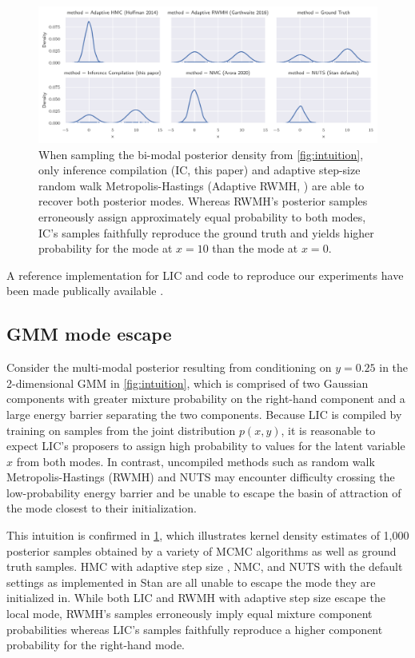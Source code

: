\documentclass[twoside]{article}
\begin{document}
\begin{figure}
  \includegraphics[width=\linewidth]{Figures/mode_escape.pdf}
  \caption{
    When sampling the bi-modal posterior density from \cref{fig:intuition},
    only inference compilation (IC, this paper) and adaptive step-size random walk
    Metropolis-Hastings (Adaptive RWMH, \cite{garthwaite2016adaptive}) are
    able to recover both posterior modes. Whereas RWMH's posterior samples
    erroneously assign approximately equal probability to both modes,
    IC's samples faithfully reproduce the ground truth and yields
    higher probability for the mode at $x=10$ than the mode at $x=0$.
  }\label{fig:gmm_mode_escape}
\end{figure}

A reference implementation for LIC and code to reproduce our experiments
have been made publically available \citep{lic2020}.

\subsection{GMM mode escape}
\label{ssec:gmm}

Consider the multi-modal posterior resulting from conditioning on $y=0.25$ in
the 2-dimensional GMM in \cref{fig:intuition}, which is comprised of two
Gaussian components with greater mixture probability on the right-hand
component and a large energy barrier separating the two components. Because
LIC is compiled by training on samples from the joint distribution $p(x, y)$,
it is reasonable to expect LIC's proposers to assign high probability to
values for the latent variable $x$ from both modes. In contrast, uncompiled
methods such as random walk Metropolis-Hastings (RWMH) and NUTS may encounter
difficulty crossing the low-probability energy barrier and be unable to escape
the basin of attraction of the mode closest to their initialization.

This intuition is confirmed in \cref{fig:gmm_mode_escape}, which illustrates
kernel density estimates of 1,000 posterior samples obtained by a variety of
MCMC algorithms as well as ground truth samples. HMC with adaptive step size
\citep{hoffman2014no}, NMC, and NUTS with the default settings as implemented
in Stan \citep{carpenter2017stan} are all unable to escape the mode they are
initialized in. While both LIC and RWMH with adaptive step size escape the
local mode, RWMH's samples erroneously imply equal mixture component
probabilities whereas LIC's samples faithfully reproduce a higher component
probability for the right-hand mode.
\end{document}
